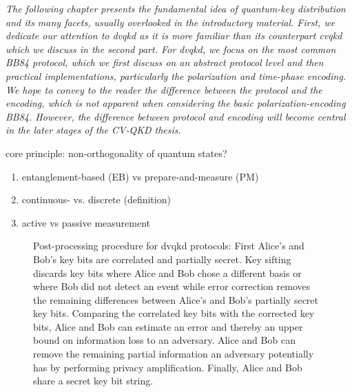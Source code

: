 \textit{The following chapter presents the fundamental idea of quantum-key distribution and its many facets, usually overlooked in the introductory material. First, we dedicate our attention to \gls{dvqkd} as it is more familiar than its counterpart \gls{cvqkd} which we discuss in the second part. For \gls{dvqkd}, we focus on the most common BB84 protocol, which we first discuss on an abstract protocol level and then practical implementations, particularly the polarization and time-phase encoding. We hope to convey to the reader the difference between the protocol and the encoding, which is not apparent when considering the basic polarization-encoding BB84. However, the difference between protocol and encoding will become central in the later stages of the CV-QKD thesis.}

core principle: non-orthogonality of quantum states?



\begin{enumerate}
	\item entanglement-based (EB) vs prepare-and-measure (PM)
	\item continuous- vs. discrete (definition)
	\item active vs passive measurement
\end{enumerate}

\begin{figure}[htb]
	\centering
	
	\caption{Post-processing procedure for \gls{dvqkd} protocols: First Alice's and Bob's key bits are correlated and partially secret. Key sifting discards key bits where Alice and Bob chose a different basis or where Bob did not detect an event while error correction removes the remaining differences between Alice's and Bob's partially secret key bits. Comparing the correlated key bits with the corrected key bits, Alice and Bob can estimate an error and thereby an upper bound on information loss to an adversary. Alice and Bob can remove the remaining partial information an adversary potentially has by performing privacy amplification. Finally, Alice and Bob share a secret key bit string.}\label{fig:post_processing}
\end{figure}